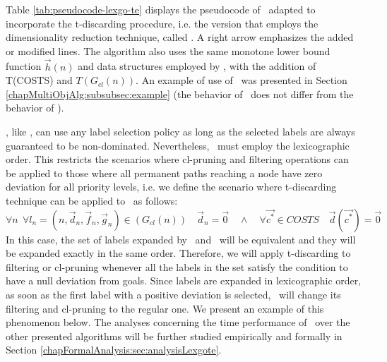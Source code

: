 Table \ref{tab:pseudocode-lexgo-te} displays the pseudocode of \lexgo \ adapted to incorporate the t-discarding procedure, i.e. the version that employs the dimensionality reduction technique, called \lexgote. A right arrow emphasizes the added or modified lines. The algorithm also uses the same monotone lower bound function $\vec h(n)$ and data structures employed by \lexgo, with the addition of T(COSTS) and $T(G_{cl}(n))$. An example of use of \lexgo \ was presented in Section \ref{chapMultiObjAlg:subsubsec:example} (the behavior of \lexgote \ does not differ from the behavior of \lexgo). 

\lexgo, like \namoa, can use any label selection policy as long as the selected labels are always guaranteed to be non-dominated. Nevertheless, \lexgote \ must employ the lexicographic order. This restricts the scenarios where cl-pruning and filtering operations can be applied to those where all permanent paths reaching a node have zero deviation for all priority levels, i.e. we define the scenario where t-discarding technique can be applied to \lexgote \ as follows:
\begin{equation}\label{eq:trunc-cond-prune-dom-lexgote}
	\forall n \ \ \forall l_n = (n, \vec d_n, \vec f_n, \vec g_n) \in (G_{cl}(n)) \quad \vec d_n = \vec 0 \quad \land \quad \forall \vec{c^*} \in COSTS \quad \vec{d}(\vec{c^*}) = \vec 0
\end{equation}
In this case, the set of labels expanded by \lexgo \ and \lexgote \ will be equivalent and they will be expanded exactly in the same order. Therefore, we will apply t-discarding to filtering or cl-pruning whenever all the labels in the set satisfy the condition to have a null deviation from goals. Since labels are expanded in lexicographic order, as soon as the first label with a positive  deviation is selected, \lexgote \ will change its filtering and cl-pruning to the regular one. We present an example of this phenomenon below. The analyses concerning the time performance of \lexgote \ over the other presented algorithms will be further studied empirically and formally in Section \ref{chapFormalAnalysis:sec:analysisLexgote}. 

